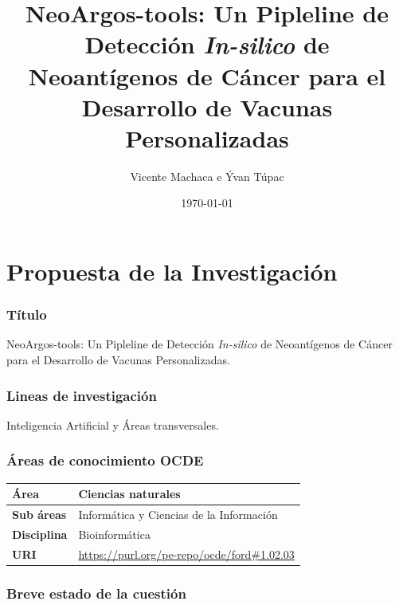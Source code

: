 \documentclass[a4paper]{article}
\title{NeoArgos-tools: Un Pipleline de Detección \textit{In-silico} de Neoantígenos de Cáncer para el Desarrollo de Vacunas Personalizadas}
\author{Vicente Machaca  e Ývan Túpac}
\date{\today}
\begin{document}
	

	
	
	
	
	
	
	
	\maketitle

\part*{Propuesta de la Investigación}

\section{Título}
NeoArgos-tools: Un Pipleline de Detección \textit{In-silico} de Neoantígenos de Cáncer para el Desarrollo de Vacunas Personalizadas.

\section{Lineas de investigación}
Inteligencia Artificial y Áreas transversales.

\section{Áreas de conocimiento OCDE}

	\begin{table}[h]
	\centering
		\setlength{\tabcolsep}{0.5em} %
		{\renewcommand{\arraystretch}{1.4}%
		\begin{tabular}{|p{3cm}|p{10cm}|} \hline
			\textbf{Área} & Ciencias naturales \\ \hline
			\textbf{Sub áreas} &  Informática y Ciencias de la Información \\ \hline
			\textbf{Disciplina} & Bioinformática \\ \hline
			\textbf{URI} &  \href{https://purl.org/pe-repo/ocde/ford\#1.02.03}{https://purl.org/pe-repo/ocde/ford\#1.02.03} \\ \hline
		\end{tabular}}
	\end{table}

	\section{Breve estado de la cuestión}
	
\end{document}
